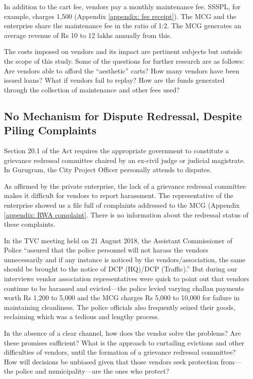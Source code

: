 \documentclass[a4paper, 12pt, twoside]{article}
\begin{document}
{{In addition to the cart fee, vendors pay a monthly maintenance fee. SSSPL, for example, charges 1,500 (Appendix \ref{appendix: fee receipt}). The MCG and the enterprise share the maintenance fee in the ratio of 1:2. The MCG generates an average revenue of Rs 10 to 12 lakhs annually from this.

The costs imposed on vendors and its impact are pertinent subjects but outside the scope of this study. Some of the questions for further research are as follows: Are vendors able to afford the “aesthetic” carts? How many vendors have been issued loans? What if vendors fail to replay? How are the funds generated through the collection of maintenance and other fees used?

\subsection*{No Mechanism for Dispute Redressal, Despite Piling Complaints}

Section 20.1 of the Act requires the appropriate government to constitute a grievance redressal committee chaired by an ex-civil judge or judicial magistrate. In Gurugram, the City Project Officer personally attends to disputes.

As affirmed by the private enterprise, the lack of a grievance redressal committee makes it difficult for vendors to report harassment. The representative of the enterprise showed us a file full of complaints addressed to the MCG (Appendix \ref{appendix: RWA complaint}. There is no information about the redressal status of these complaints.

In the TVC meeting held on 21 August 2018, the Assistant Commissioner of Police “assured that the police personnel will not harass the vendors unnecessarily and if any instance is noticed by the vendors/association, the same should be brought to the notice of DCP (HQ)/DCP (Traffic).” But during our interviews vendor association representatives were quick to point out that  vendors continue to be harassed and evicted—the police levied varying challan payments worth Rs 1,200 to 5,000 and the MCG charges Rs 5,000 to 10,000 for failure in maintaining cleanliness. The police officials also frequently seized their goods, reclaiming which was a tedious and lengthy process.

In the absence of a clear channel, how does the vendor solve the problems? Are these promises sufficient? What is the approach to curtailing evictions and other difficulties of vendors, until the formation of a grievance redressal committee? How will decisions be unbiased given that those vendors seek protection from—the police and municipality—are the ones who protect?

}}
\end{document}
